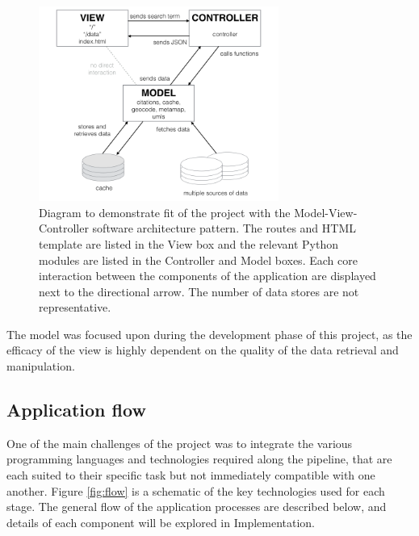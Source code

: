 \documentclass[Report.tex]{subfiles}
\begin{document}
\begin{figure}[!h]
\begin{center}
	\includegraphics[width=0.7\textwidth]{../lib/images/mvc.png}
	\caption{Diagram to demonstrate fit of the project with the Model-View-Controller software architecture pattern. The routes and HTML template are listed in the View box and the relevant Python modules are listed in the Controller and Model boxes. Each core interaction between the components of the application are displayed next to the directional arrow. The number of data stores are not representative.}
\label{fig:mvc}
\end{center}
\end{figure}

\noindent The model was focused upon during the development phase of this project, as the efficacy of the view is highly dependent on the quality of the data retrieval and manipulation. 

\subsection{Application flow}
One of the main challenges of the project was to integrate the various programming languages and technologies required along the pipeline, that are each suited to their specific task but not immediately compatible with one another. Figure \ref{fig:flow} is a schematic of the key technologies used for each stage. The general flow of the application processes are described below, and details of each component will be explored in Implementation.
\end{document}
